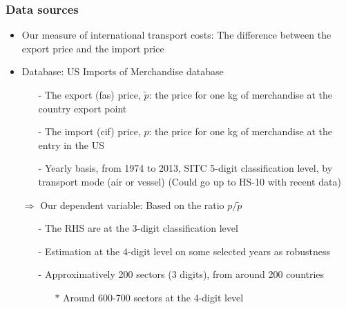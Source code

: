 \documentclass[10 pt,Helvetica, french]{beamer}
\begin{document}
\begin{frame} [label=slide_data]
\frametitle{Data sources}
\begin{itemize}
\item Our measure of international transport costs: The difference between the export price and the import price \vspace{0.1cm}
\item Database: US Imports of Merchandise database \vspace{0.1cm}
\begin{itemize}
\item[-] The export (fas) price, $\widetilde{p}$: the price for one kg of merchandise at the country export point \vspace{0.1cm}
\item[-] The import (cif) price, $p$: the price for one kg of merchandise at the entry in the US \vspace{0.1cm}
\item[-] Yearly basis, from 1974 to 2013, SITC 5-digit classification level, by transport mode (air or vessel) (Could go up to HS-10 with recent data)\vspace{0.1cm}
\end{itemize}
\item[$\Rightarrow$] Our dependent variable: Based on the ratio $p/\widetilde{p}$ \vspace{0.1cm}
\begin{itemize}
\item[-] The RHS are at the 3-digit classification level  \vspace{0.1cm}
\item[-] Estimation at the 4-digit level on some selected years as robustness \vspace{0.1cm}
\item[-] Approximatively 200 sectors (3 digits), from around 200 countries  \vspace{0.1cm}
\begin{itemize}
\item[$\ast$] Around 600-700 sectors at the 4-digit level
\end{itemize}
\end{itemize}
\end{itemize}
\end{frame}
\end{document}

